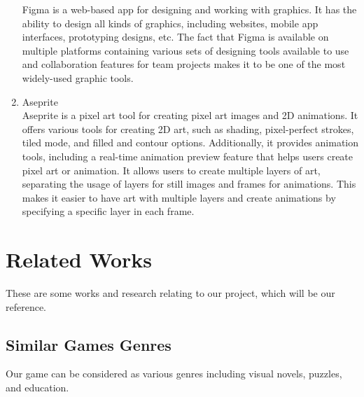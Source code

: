 \documentclass[12pt,oneside,openright,a4paper]{cpe-english-project}
\begin{document}
\begin{enumerate}
	Figma is a web-based app for designing and working with graphics. It has the ability to design all kinds of graphics, including websites, mobile app interfaces, prototyping designs, etc. The fact that Figma is available on multiple platforms containing various sets of designing tools available to use and collaboration features for team projects \cite{daniel2022} makes it to be one of the most widely-used graphic tools.
	\item Aseprite \\
	Aseprite is a pixel art tool for creating pixel art images and 2D animations. It offers various tools for creating 2D art, such as shading, pixel-perfect strokes, tiled mode, and filled and contour options. Additionally, it provides animation tools, including a real-time animation preview feature that helps users create pixel art or animation. It allows users to create multiple layers of art, separating the usage of layers for still images and frames for animations. This makes it easier to have art with multiple layers and create animations by specifying a specific layer in each frame.
\end{enumerate}


\section{Related Works}
These are some works and research relating to our project, which will be our reference.

\subsection{Similar Games Genres}
Our game can be considered as various genres including visual novels, puzzles, and education.
\end{document}
